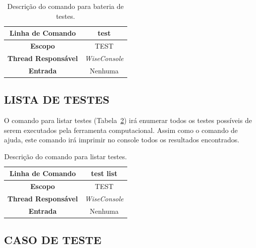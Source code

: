 \begin{center}
	\begin{table}[!htbp]
		\begin{tabularx}{\textwidth}{c|X}
			\toprule
			\textbf{Linha de Comando} & \multicolumn{1}{c}{test} \\
			\midrule
			\textbf{Escopo} & \multicolumn{1}{c}{TEST} \\
			\hline
			\textbf{Thread Responsável} & \multicolumn{1}{c}{\textit{WiseConsole}} \\
			\hline
			\textbf{Entrada} & \multicolumn{1}{c}{Nenhuma} \\
			\bottomrule
		\end{tabularx}
		\caption{Descrição do comando para bateria de testes.}
		\label{tab:test}
	\end{table}
\end{center}

\subsection{LISTA DE TESTES}\label{sec:test list}

O comando para listar testes (Tabela~\ref{tab:list_test}) irá enumerar todos os testes possíveis de serem executados pela ferramenta computacional. Assim como o comando de ajuda, este comando irá imprimir no console todos os resultados encontrados.

\begin{center}
	\begin{table}[!htbp]
		\begin{tabularx}{\textwidth}{c|X}
			\toprule
			\textbf{Linha de Comando} & \multicolumn{1}{c}{test list} \\
			\midrule
			\textbf{Escopo} & \multicolumn{1}{c}{TEST} \\
			\hline
			\textbf{Thread Responsável} & \multicolumn{1}{c}{\textit{WiseConsole}} \\
			\hline
			\textbf{Entrada} & \multicolumn{1}{c}{Nenhuma} \\
			\bottomrule
		\end{tabularx}
		\caption{Descrição do comando para listar testes.}
		\label{tab:list_test}
	\end{table}
\end{center}

\subsection{CASO DE TESTE}\label{sec:case list}

